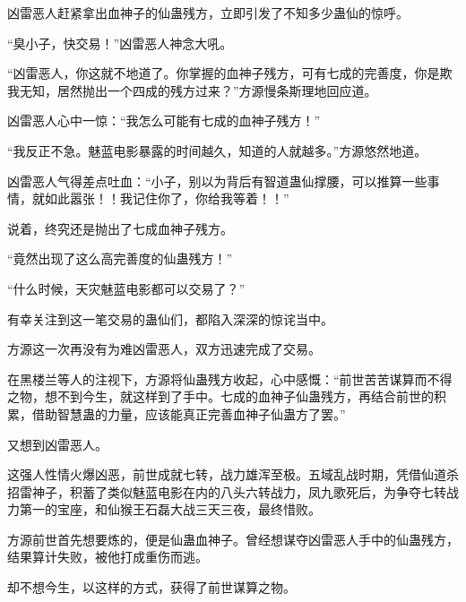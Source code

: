 \begin{this_body}
凶雷恶人赶紧拿出血神子的仙蛊残方，立即引发了不知多少蛊仙的惊呼。

“臭小子，快交易！”凶雷恶人神念大吼。

“凶雷恶人，你这就不地道了。你掌握的血神子残方，可有七成的完善度，你是欺我无知，居然抛出一个四成的残方过来？”方源慢条斯理地回应道。

凶雷恶人心中一惊：“我怎么可能有七成的血神子残方！”

“我反正不急。魅蓝电影暴露的时间越久，知道的人就越多。”方源悠然地道。

凶雷恶人气得差点吐血：“小子，别以为背后有智道蛊仙撑腰，可以推算一些事情，就如此嚣张！！我记住你了，你给我等着！！”

说着，终究还是抛出了七成血神子残方。

“竟然出现了这么高完善度的仙蛊残方！”

“什么时候，天灾魅蓝电影都可以交易了？”

有幸关注到这一笔交易的蛊仙们，都陷入深深的惊诧当中。

方源这一次再没有为难凶雷恶人，双方迅速完成了交易。

在黑楼兰等人的注视下，方源将仙蛊残方收起，心中感慨：“前世苦苦谋算而不得之物，想不到今生，就这样到了手中。七成的血神子仙蛊残方，再结合前世的积累，借助智慧蛊的力量，应该能真正完善血神子仙蛊方了罢。”

又想到凶雷恶人。

这强人性情火爆凶恶，前世成就七转，战力雄浑至极。五域乱战时期，凭借仙道杀招雷神子，积蓄了类似魅蓝电影在内的八头六转战力，凤九歌死后，为争夺七转战力第一的宝座，和仙猴王石磊大战三天三夜，最终惜败。

方源前世首先想要炼的，便是仙蛊血神子。曾经想谋夺凶雷恶人手中的仙蛊残方，结果算计失败，被他打成重伤而逃。

却不想今生，以这样的方式，获得了前世谋算之物。

\end{this_body}

